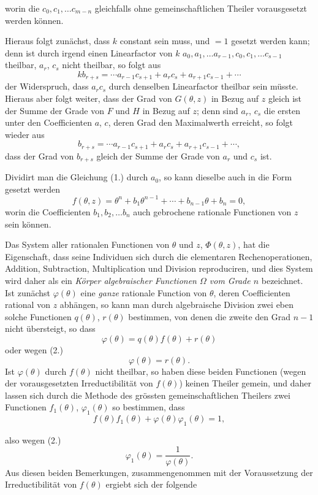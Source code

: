 \documentclass{article}
\begin{document}
worin die $c_{0}, c_{1}, \ldots c_{m-n}$ gleichfalls ohne gemeinschaftlichen Theiler vorausgesetzt werden können.

Hieraus folgt zunächst, dass $k$ constant sein muss, und $=1$ gesetzt werden kann; denn ist durch irgend einen Linearfactor von $k$ $a_{0}, a_{1}, \ldots a_{r-1}, c_{0}, c_{1}, \ldots c_{s-1}$ theilbar, $a_{r}$, $c_{s}$ nicht theilbar, so folgt aus
\[ kb_{r+s} = \cdots a_{r-1}c_{s+1} + a_{r}c_{s} + a_{r+1}c_{s-1} + \cdots \]
der Widerspruch, dass $a_{r}c_{s}$ durch denselben Linearfactor theilbar sein müsste. Hieraus aber folgt weiter, dass der Grad von $G(\theta, z)$ in Bezug auf $z$ gleich ist der Summe der Grade von $F$ und $H$ in Bezug auf $z$; denn sind $a_{r}$, $c_{s}$ die ersten unter den Coefficienten $a$, $c$, deren Grad den Maximalwerth erreicht, so folgt wieder aus
\[ b_{r+s} = \cdots a_{r-1}c_{s+1} + a_{r}c_{s} + a_{r+1}c_{s-1} + \cdots, \]
dass der Grad von $b_{r+s}$ gleich der Summe der Grade von $a_{r}$ und $c_{s}$ ist.

Dividirt man die Gleichung (1.) durch $a_{0}$, so kann dieselbe auch in die Form gesetzt werden
\[ f(\theta, z) = \theta^{n} + b_{1}\theta^{n-1} + \cdots + b_{n-1}\theta + b_{n} = 0, \tag{2.} \]
worin die Coefficienten $b_{1}, b_{2}, \ldots b_{n}$ auch gebrochene rationale Functionen von $z$ sein können.

Das System aller rationalen Functionen von $\theta$ und $z$, $\Phi(\theta, z)$, hat die Eigenschaft, dass seine Individuen sich durch die elementaren Rechenoperationen, Addition, Subtraction, Multiplication und Division reproduciren, und dies System wird daher als ein \emph{Körper algebraischer Functionen $\Omega$ vom Grade $n$} bezeichnet. Ist zunächst $\varphi(\theta)$ eine \emph{ganze} rationale Function von $\theta$, deren Coefficienten rational von $z$ abhängen, so kann man durch algebraische Division zwei eben solche Functionen $q(\theta)$, $r(\theta)$ bestimmen, von denen die zweite den Grad $n-1$ nicht übersteigt, so dass
\[ \varphi(\theta) = q(\theta)f(\theta) + r(\theta) \]
oder wegen (2.)
\[ \varphi(\theta) = r(\theta). \]
Ist $\varphi(\theta)$ durch $f(\theta)$ nicht theilbar, so haben diese beiden Functionen (wegen der vorausgesetzten Irreductibilität von $f(\theta)$) keinen Theiler gemein, und daher lassen sich durch die Methode des grössten gemeinschaftlichen Theilers zwei Functionen $f_{1}(\theta)$, $\varphi_{1}(\theta)$ so bestimmen, dass
\[ f(\theta)f_{1}(\theta) + \varphi(\theta)\varphi_{1}(\theta) = 1, \]

also wegen (2.)
\[ \varphi_{1}(\theta) = \frac{1}{\varphi(\theta)}. \]
Aus diesen beiden Bemerkungen, zusammengenommen mit der Voraussetzung der Irreductibilität von $f(\theta)$ ergiebt sich der folgende
\end{document}
